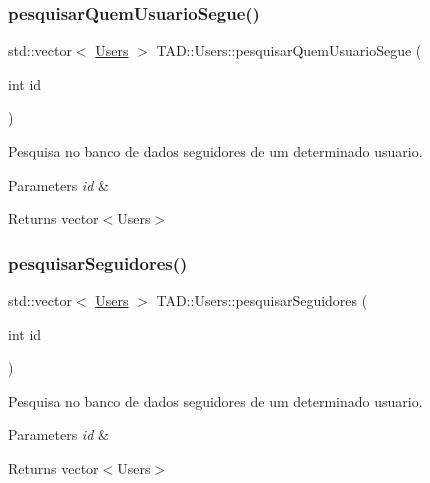 \subsubsection{\texorpdfstring{pesquisar\+Quem\+Usuario\+Segue()}{pesquisarQuemUsuarioSegue()}}
{\footnotesize\ttfamily std\+::vector$<$ \hyperlink{class_t_a_d_1_1_users}{Users} $>$ T\+A\+D\+::\+Users\+::pesquisar\+Quem\+Usuario\+Segue (\begin{DoxyParamCaption}\item[{int}]{id }\end{DoxyParamCaption})}



Pesquisa no banco de dados seguidores de um determinado usuario. 


\begin{DoxyParams}{Parameters}
{\em id} & \\
\hline
\end{DoxyParams}
\begin{DoxyReturn}{Returns}
vector$<$\+Users$>$ 
\end{DoxyReturn}
\mbox{\label{class_t_a_d_1_1_users_ad9fbbedbd2731b8738c855e97b9d827b}} 
\subsubsection{\texorpdfstring{pesquisar\+Seguidores()}{pesquisarSeguidores()}}
{\footnotesize\ttfamily std\+::vector$<$ \hyperlink{class_t_a_d_1_1_users}{Users} $>$ T\+A\+D\+::\+Users\+::pesquisar\+Seguidores (\begin{DoxyParamCaption}\item[{int}]{id }\end{DoxyParamCaption})}



Pesquisa no banco de dados seguidores de um determinado usuario. 


\begin{DoxyParams}{Parameters}
{\em id} & \\
\hline
\end{DoxyParams}
\begin{DoxyReturn}{Returns}
vector$<$\+Users$>$ 
\end{DoxyReturn}
\mbox{\label{class_t_a_d_1_1_users_ad1e42eb4429af0ed1399d72f8c531c27}} 
